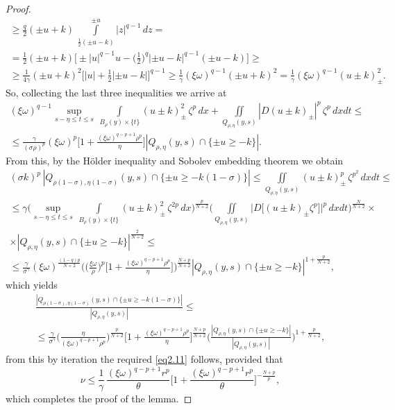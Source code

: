 \documentclass[a4paper,11pt,fullpage]{article}
\numberwithin{equation}{section}
\begin{document}
\begin{proof}
\begin{multline*}
\geqslant \frac{q}{2}(\pm u +k)\,\int\limits^{\pm u}_{\frac{1}{2}(\pm u-k)}|z|^{q-1}\,dz=\\=
\frac{1}{2}(\pm u +k)\Big[\pm|u|^{q-1} u- \Big(\frac{1}{2}\Big)^q |\pm u-k|^{q-1}(\pm u-k)\Big]\geqslant\\\geqslant \frac{1}{4 \gamma}(\pm u +k)^2
\Big[|u|+\frac{1}{2} |\pm u-k|\Big]^{q-1}\geqslant \frac{1}{\gamma}(\xi \omega)^{q-1}(\pm u +k)^2=\frac{1}{\gamma}(\xi \omega)^{q-1}
(u\pm k)^2_{\pm}.
\end{multline*}
So, collecting the last three inequalities we arrive at
\begin{multline*}
(\xi \omega)^{q-1}\sup\limits_{s-\eta\leqslant t\leqslant s}\,\int\limits_{B_\rho(y)\times\{t\}}(u \pm k)^2_{\pm}\,\zeta^p\,dx+
\iint\limits_{Q_{\rho,\eta}(y, s)}|D(u\pm k)_{\pm}|^p\,\zeta^p\,dx dt\leqslant\\\leqslant \frac{\gamma}{(\sigma \rho)^p}(\xi \omega)^p\Big[1+\frac{(\xi \omega)^{q-p+1} \rho^p}{\eta}\Big]|Q_{\rho, \eta}(y, s)\cap\{\pm u \geqslant -k\}|.
\end{multline*}
From this, by the H\"{o}lder inequality and Sobolev embedding theorem we obtain
\begin{multline*}
(\sigma k)^p\,|Q_{\rho(1-\sigma), \eta(1-\sigma)}(y, s)\cap\{\pm u \geqslant -k (1-\sigma)\}|\leqslant\iint\limits_{Q_{\rho, \eta}(y, s)}(u\pm k)^p_{\pm}\,\zeta^{p^2}\,dx dt\leqslant\\\leqslant \gamma \Big(\sup\limits_{s-\eta\leqslant t\leqslant s}\,\int\limits_{B_\rho(y)\times\{t\}}(u \pm k)^2_{\pm}\,\zeta^{2 p}\,dx\Big)^{\frac{p}{N+2}}\Big(\iint\limits_{Q_{\rho,\eta}(y, s)}\big|D\big[(u\pm k)_{\pm}\zeta^p\big]\big|^p\,dx dt\Big)^{\frac{N}{N+2}}\times\\\times|Q_{\rho, \eta}(y, s)\cap\{\pm u \geqslant -k\}|^{\frac{2}{N+2}}\leqslant\\\leqslant\frac{\gamma}{\sigma^\gamma}(\xi \omega)^{\frac{(1-q)p}{N+2}}\bigg(\Big(\frac{\xi \omega}{\rho}\Big)^p\Big[1+\frac{(\xi \omega)^{q-p+1} \rho^p}{\eta}\Big]\bigg)^{\frac{N+p}{N+2}}
|Q_{\rho, \eta}(y, s)\cap\{\pm u \geqslant -k\}|^{1+\frac{p}{N+2}},
\end{multline*}
which yields
\begin{multline*}
\frac{|Q_{\rho(1-\sigma), \eta(1-\sigma)}(y, s)\cap\{\pm u \geqslant -k (1-\sigma)\}|}{|Q_{\rho, \eta}(y, s)|}\leqslant\\\leqslant \frac{\gamma}{\sigma^\gamma}\Big(\frac{\eta}{(\xi \omega)^{q-p+1}\rho^p}\Big)^{\frac{p}{N+2}}\Big[1+\frac{(\xi \omega)^{q-p+1} \rho^p}{\eta}\Big]^{\frac{N+p}{N+2}} \bigg(\frac{|Q_{\rho, \eta}(y, s)\cap\{\pm u \geqslant -k\}|}{|Q_{\rho, \eta}(y, s)|}
\bigg)^{1+\frac{p}{N+2}},
\end{multline*}
from this by iteration the required \eqref{eq2.11} follows, provided that
\begin{equation}\label{eq2.12}
\nu\leqslant \frac{1}{\gamma}\,\frac{(\xi \omega)^{q-p+1} r^p}{\theta}\Big[1+\frac{(\xi \omega)^{q-p+1} r^p}{\theta}\Big]^{-\frac{N+p}{p}},
\end{equation}
which completes the proof of the lemma.
\end{proof}
\end{document}
